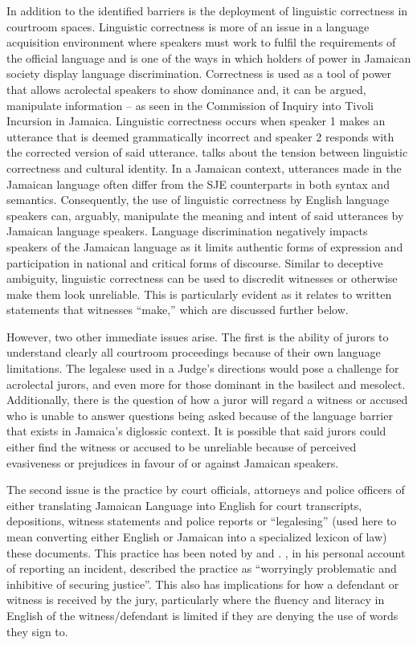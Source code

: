\documentclass[output=paper,colorlinks,citecolor=brown]{langscibook}
\begin{document}
In addition to the identified barriers is the deployment of linguistic correctness in courtroom spaces. Linguistic correctness is more of an issue in a language acquisition environment where speakers must work to fulfil the requirements of the official language and is one of the ways in which holders of power in Jamaican society display language discrimination. Correctness is used as a tool of power that allows acrolectal speakers to show dominance and, it can be argued, manipulate information -- as seen in the Commission of Inquiry into Tivoli Incursion in Jamaica. Linguistic correctness occurs when speaker 1 makes an utterance that is deemed grammatically incorrect and speaker 2 responds with the corrected version of said utterance. \citet{Urciuoli2008} talks about the tension between linguistic correctness and cultural identity. In a Jamaican context, utterances made in the Jamaican language often differ from the SJE counterparts in both syntax and semantics. Consequently, the use of linguistic correctness by English language speakers can, arguably, manipulate the meaning and intent of said utterances by Jamaican language speakers. Language discrimination negatively impacts speakers of the Jamaican language as it limits authentic forms of expression and participation in national and critical forms of discourse. Similar to deceptive ambiguity, linguistic correctness can be used to discredit witnesses or otherwise make them look unreliable. This is particularly evident as it relates to written statements that witnesses “make,” which are discussed further below.

However, two other immediate issues arise. The first is the ability of jurors to understand clearly all courtroom proceedings because of their own language limitations. The legalese used in a Judge’s directions would pose a challenge for acrolectal jurors, and even more for those dominant in the basilect and mesolect. Additionally, there is the question of how a juror will regard a witness or accused who is unable to answer questions being asked because of the language barrier that exists in Jamaica’s diglossic context. It is possible that said jurors could either find the witness or accused to be unreliable because of perceived evasiveness or prejudices in favour of or against Jamaican speakers.

The second issue is the practice by court officials, attorneys and police officers of either translating Jamaican Language into English for court transcripts, depositions, witness statements and police reports or “legalesing” (used here to mean converting either English or Jamaican into a specialized lexicon of law) these documents. This practice has been noted by \citet{Eades2003} and \citet{BrownBlake2017}. \citet{Nelson2019}, in his personal account of reporting an incident, described the practice as “worryingly problematic and inhibitive of securing justice”. This also has implications for how a defendant or witness is received by the jury, particularly where the fluency and literacy in English of the witness/defendant is limited if they are denying the use of words they sign to.
\end{document}
